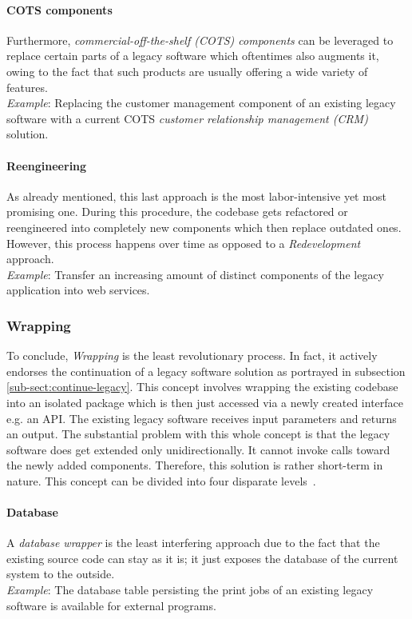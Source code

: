 \documentclass[12pt,a4paper,twoside]{report}
\begin{document}
\paragraph{COTS components}
Furthermore, \textit{commercial-off-the-shelf (COTS) components} can be
leveraged to replace certain parts of a legacy software which oftentimes also
augments it, owing to the fact that such products are usually offering a wide
variety of features.\\
\textit{Example}: Replacing the customer management component of an existing
legacy software with a current COTS \textit{customer relationship management (CRM)} solution.

\paragraph{Reengineering}
As already mentioned, this last approach is the most labor-intensive yet most promising one.
During this procedure, the codebase gets refactored or reengineered
into completely new components which then replace outdated ones.
However, this process happens over time as opposed to a \textit{Redevelopment} approach.\\
\textit{Example}: Transfer an increasing amount of distinct components
of the legacy application into web services.


\subsubsection{Wrapping}

To conclude, \textit{Wrapping} is the least revolutionary process.
In fact, it actively endorses the continuation of a legacy software solution as
portrayed in subsection \ref{sub-sect:continue-legacy}.
This concept involves wrapping the existing codebase into an isolated package
which is then just accessed via a newly created interface e.g. an API.
The existing legacy software receives input parameters and returns an output.
The substantial problem with this whole concept is that the legacy software does get
extended only unidirectionally. It cannot invoke calls toward the newly added components.
Therefore, this solution is rather short-term in nature.
This concept can be divided into four disparate levels~\cite{sneed-encapsulating-legacy}.

\paragraph{Database}
A \textit{database wrapper} is the least interfering approach due to the fact that
the existing source code can stay as it is; it just exposes the database of the current system
to the outside.\\
\textit{Example}: The database table persisting the print jobs of an existing legacy software
is available for external programs.
\end{document}
